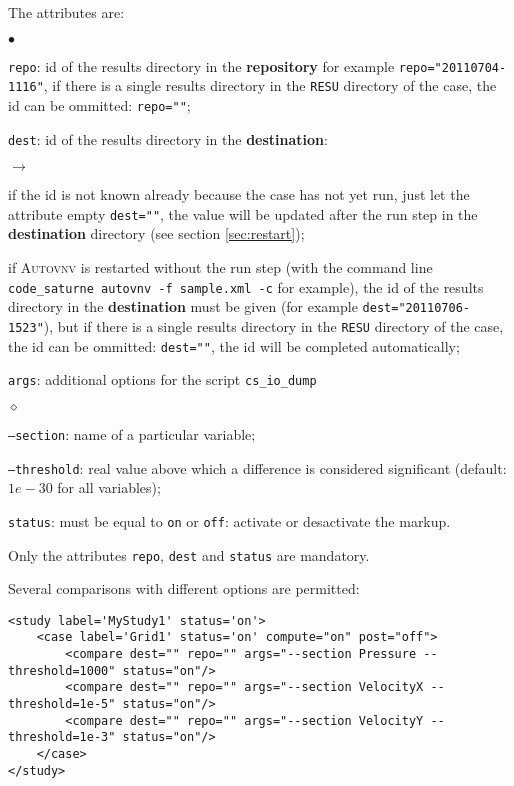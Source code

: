 \documentclass[a4paper,10pt,twoside]{csshortdoc}
\begin{document}
The attributes are:
\begin{list}{$\bullet$}{}

\item \texttt{repo}: id of the results directory in the \textbf{repository} for
example \texttt{repo="20110704-1116"}, if there is a single results directory
in the \texttt{RESU} directory of the case, the id can be ommitted:
\texttt{repo=""};

\item \texttt{dest}: id of the results directory in the \textbf{destination}:
\begin{list}{$\rightarrow$}{}
\item if the id is not known already because the case has not yet run, just let
the attribute empty \texttt{dest=""}, the value will be updated after the run
step in the \textbf{destination} directory (see section \ref{sec:restart});
\item if \textsc{Autovnv} is restarted without the run step (with the command
line \texttt{code\_saturne autovnv -f sample.xml -c} for example), the id of
the results directory in the \textbf{destination} must be given (for example
\texttt{dest="20110706-1523"}), but if there is a single results directory in
the \texttt{RESU} directory of the case, the id can be ommitted:
\texttt{dest=""}, the id will be completed automatically;
\end{list}

\item \texttt{args}: additional options for the script \texttt{cs\_io\_dump}
\begin{list}{$\diamond$}{}
\item \texttt{--section}: name of a particular variable;
\item \texttt{--threshold}: real value above which a difference is considered
significant (default: $1e-30$ for all variables);
\end{list}
\item \texttt{status}: must be equal to \texttt{on} or \texttt{off}:
activate or desactivate the markup.
\end{list}

Only the attributes \texttt{repo}, \texttt{dest} and \texttt{status} are
mandatory.

Several comparisons with different options are permitted:
\small
\begin{verbatim}
<study label='MyStudy1' status='on'>
    <case label='Grid1' status='on' compute="on" post="off">
        <compare dest="" repo="" args="--section Pressure --threshold=1000" status="on"/>
        <compare dest="" repo="" args="--section VelocityX --threshold=1e-5" status="on"/>
        <compare dest="" repo="" args="--section VelocityY --threshold=1e-3" status="on"/>
    </case>
</study>
\end{verbatim}
\normalsize
\end{document}
